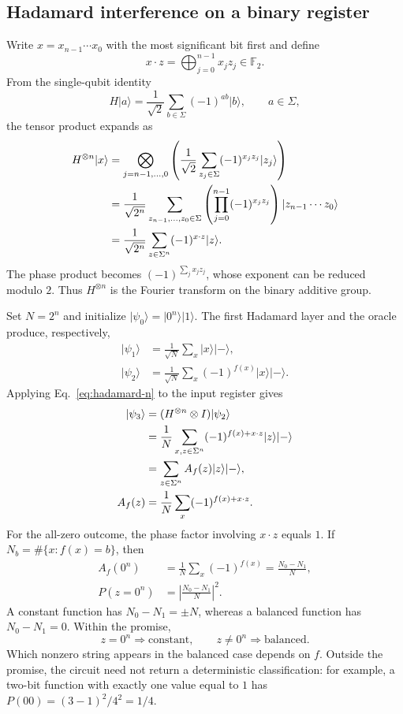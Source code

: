 \documentclass[11pt,oneside,openany]{book}
\providecommand{\ket}{}
\renewcommand{\ket}[1]{\lvert #1\rangle}
\newcommand{\Ftwo}{\mathbb F_2}
\theoremstyle{definition}
\begin{document}
\subsection{Hadamard interference on a binary register}
Write $x=x_{n-1}\cdots x_0$ with the most significant bit first and define
\begin{equation}
 x\cdot z=\bigoplus_{j=0}^{n-1}x_jz_j\in\Ftwo.
 \label{eq:binary-inner}
\end{equation}
From the single-qubit identity
\begin{equation}
 H\ket a=\frac1{\sqrt2}\sum_{b\in\Sigma}(-1)^{ab}\ket b,
 \qquad a\in\Sigma,
\end{equation}
the tensor product expands as
\begin{align}
 H^{\otimes n}\ket x
 &=\bigotimes_{j=n-1,\ldots,0}\left(\frac1{\sqrt2}\sum_{z_j\in\Sigma}(-1)^{x_jz_j}\ket{z_j}\right)\notag\\
 &=\frac1{\sqrt{2^n}}\sum_{z_{n-1},\ldots,z_0\in\Sigma}
 \left(\prod_{j=0}^{n-1}(-1)^{x_jz_j}\right)\ket{z_{n-1}\cdots z_0}\notag\\
 &=\frac1{\sqrt{2^n}}\sum_{z\in\Sigma^n}(-1)^{x\cdot z}\ket z.
 \label{eq:hadamard-n}
\end{align}
The phase product becomes $(-1)^{\sum_jx_jz_j}$, whose exponent can be reduced modulo $2$. Thus $H^{\otimes n}$ is the Fourier transform on the binary additive group.

Set $N=2^n$ and initialize $\ket{\psi_0}=\ket{0^n}\ket1$. The first Hadamard layer and the oracle produce, respectively,
\begin{align}
 \ket{\psi_1}&=\frac1{\sqrt N}\sum_x\ket x\ket-,\\
 \ket{\psi_2}&=\frac1{\sqrt N}\sum_x(-1)^{f(x)}\ket x\ket-.
\end{align}
Applying Eq.~\eqref{eq:hadamard-n} to the input register gives
\begin{align}
 \ket{\psi_3}
 &=(H^{\otimes n}\otimes I)\ket{\psi_2}\notag\\
 &=\frac1N\sum_{x,z\in\Sigma^n}(-1)^{f(x)+x\cdot z}\ket z\ket-\notag\\
 &=\sum_{z\in\Sigma^n}A_f(z)\ket z\ket-,
 \label{eq:dj-final-state}\\
 A_f(z)&=\frac1N\sum_x(-1)^{f(x)+x\cdot z}.
 \label{eq:dj-amplitude}
\end{align}
For the all-zero outcome, the phase factor involving $x\cdot z$ equals $1$. If $N_b=\#\{x:f(x)=b\}$, then
\begin{align}
 A_f(0^n)&=\frac1N\sum_x(-1)^{f(x)}=\frac{N_0-N_1}{N},\\
 P(z=0^n)&=\left|\frac{N_0-N_1}{N}\right|^2.
 \label{eq:dj-zero-probability}
\end{align}
A constant function has $N_0-N_1=\pm N$, whereas a balanced function has $N_0-N_1=0$. Within the promise,
\begin{equation}
 z=0^n\Longrightarrow\text{constant},\qquad
 z\ne0^n\Longrightarrow\text{balanced}.
\end{equation}
Which nonzero string appears in the balanced case depends on $f$. Outside the promise, the circuit need not return a deterministic classification: for example, a two-bit function with exactly one value equal to $1$ has $P(00)=(3-1)^2/4^2=1/4$.
\end{document}
